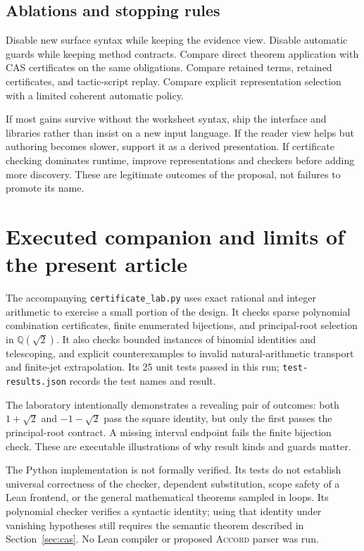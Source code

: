 \documentclass[11pt,a4paper]{article}
\newcommand{\code}[1]{\nolinkurl{#1}}
\newcommand{\Accord}{\textsc{Accord}}
\newcommand{\Q}{\mathbb{Q}}
\theoremstyle{definition}
\begin{document}
\subsection{Ablations and stopping rules}
Disable new surface syntax while keeping the evidence view. Disable automatic
guards while keeping method contracts. Compare direct theorem application with
CAS certificates on the same obligations. Compare retained terms, retained
certificates, and tactic-script replay. Compare explicit representation selection
with a limited coherent automatic policy.

If most gains survive without the worksheet syntax, ship the interface and
libraries rather than insist on a new input language. If the reader view helps
but authoring becomes slower, support it as a derived presentation. If certificate
checking dominates runtime, improve representations and checkers before adding
more discovery. These are legitimate outcomes of the proposal, not failures to
promote its name.

\section{Executed companion and limits of the present article}
\label{sec:limits}
The accompanying \code{certificate_lab.py} uses exact rational and integer
arithmetic to exercise a small portion of the design. It checks sparse polynomial
combination certificates, finite enumerated bijections, and principal-root
selection in $\Q(\sqrt2)$. It also checks bounded instances of binomial identities
and telescoping, and explicit counterexamples to invalid natural-arithmetic
transport and finite-jet extrapolation. Its 25 unit tests passed in this run;
\code{test-results.json} records the test names and result.

The laboratory intentionally demonstrates a revealing pair of outcomes: both
$1+\sqrt2$ and $-1-\sqrt2$ pass the square identity, but only the first passes
the principal-root contract. A missing interval endpoint fails the finite
bijection check. These are executable illustrations of why result kinds and
guards matter.

The Python implementation is not formally verified. Its tests do not establish
universal correctness of the checker, dependent substitution, scope safety of a
Lean frontend, or the general mathematical theorems sampled in loops. Its
polynomial checker verifies a syntactic identity; using that identity under
vanishing hypotheses still requires the semantic theorem described in
Section~\ref{sec:cas}. No Lean compiler or proposed \Accord{} parser was run.
\end{document}

